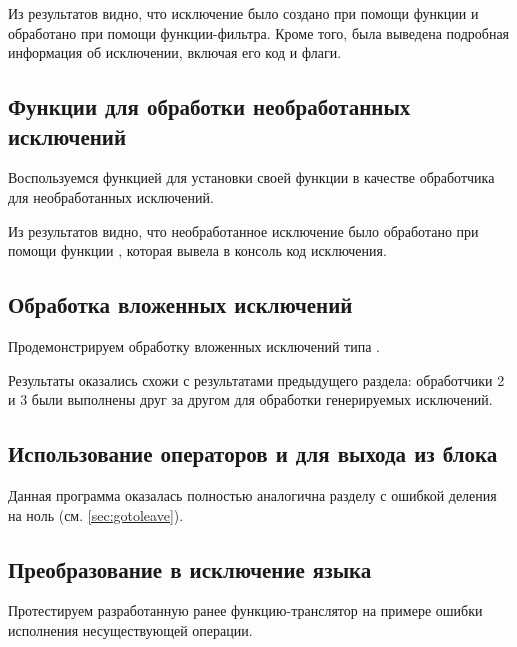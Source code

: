
Из результатов видно, что исключение было создано при помощи функции  и обработано при помощи функции-фильтра. Кроме того, была выведена подробная информация об исключении, включая его код и флаги.

\subsection{Функции для обработки необработанных исключений}

Воспользуемся функцией  для установки своей функции в качестве обработчика для необработанных исключений.


Из результатов видно, что необработанное исключение было обработано при помощи функции , которая вывела в консоль код исключения.

\subsection{Обработка вложенных исключений}

Продемонстрируем обработку вложенных исключений типа .


Результаты оказались схожи с результатами предыдущего раздела: обработчики 2 и 3 были выполнены друг за другом для обработки генерируемых исключений.

\subsection{Использование операторов  и  для выхода из блока }

Данная программа оказалась полностью аналогична разделу с ошибкой деления на ноль (см. \ref{sec:gotoleave}).

\subsection{Преобразование в исключение языка }

Протестируем разработанную ранее функцию-транслятор  на примере ошибки исполнения несуществующей операции.


